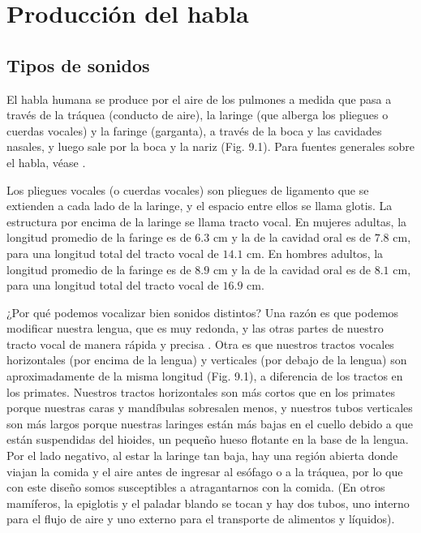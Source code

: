 \documentclass[12pt]{book}
\begin{document}

\section{Producción del habla}

\subsection{Tipos de sonidos}

El habla humana se produce por el aire de los pulmones a medida que pasa a través de la tráquea (conducto de aire), la laringe (que alberga los pliegues o cuerdas vocales) y la faringe (garganta), a través de la boca y las cavidades nasales, y luego sale por la boca y la nariz (Fig. 9.1). Para fuentes generales sobre el habla, véase \cite{6, 7, 16, 17, 23, 29, 31, 43, 66, 69, 76}.

Los pliegues vocales (o cuerdas vocales) son pliegues de ligamento que se extienden a cada lado de la laringe, y el espacio entre ellos se llama glotis. La estructura por encima de la laringe se llama tracto vocal. En mujeres adultas, la longitud promedio de la faringe es de $6.3\text{ cm}$ y la de la cavidad oral es de $7.8\text{ cm}$, para una longitud total del tracto vocal de $14.1\text{ cm}$. En hombres adultos, la longitud promedio de la faringe es de $8.9\text{ cm}$ y la de la cavidad oral es de $8.1\text{ cm}$, para una longitud total del tracto vocal de $16.9\text{ cm}$.

¿Por qué podemos vocalizar bien sonidos distintos? Una razón es que podemos modificar nuestra lengua, que es muy redonda, y las otras partes de nuestro tracto vocal de manera rápida y precisa \cite{43, 44}. Otra es que nuestros tractos vocales horizontales (por encima de la lengua) y verticales (por debajo de la lengua) son aproximadamente de la misma longitud (Fig. 9.1), a diferencia de los tractos en los primates. Nuestros tractos horizontales son más cortos que en los primates porque nuestras caras y mandíbulas sobresalen menos, y nuestros tubos verticales son más largos porque nuestras laringes están más bajas en el cuello debido a que están suspendidas del hioides, un pequeño hueso flotante en la base de la lengua. Por el lado negativo, al estar la laringe tan baja, hay una región abierta donde viajan la comida y el aire antes de ingresar al esófago o a la tráquea, por lo que con este diseño somos susceptibles a atragantarnos con la comida. (En otros mamíferos, la epiglotis y el paladar blando se tocan y hay dos tubos, uno interno para el flujo de aire y uno externo para el transporte de alimentos y líquidos).
\end{document}
